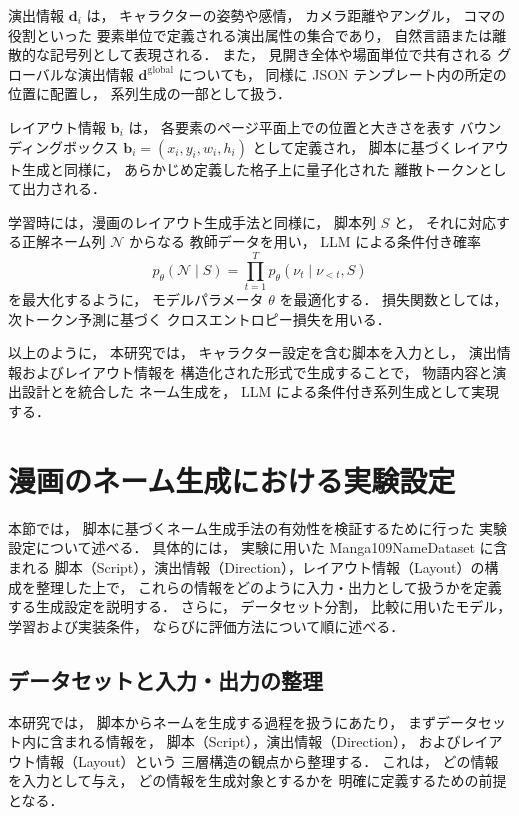 \documentclass[a4j,12pt,dvipdfmx]{jsreport}
\begin{document}
演出情報 $\mathbf{d}_i$ は，
キャラクターの姿勢や感情，
カメラ距離やアングル，
コマの役割といった
要素単位で定義される演出属性の集合であり，
自然言語または離散的な記号列として表現される．
また，
見開き全体や場面単位で共有される
グローバルな演出情報
$\mathbf{d}^{\mathrm{global}}$ についても，
同様に JSON テンプレート内の所定の位置に配置し，
系列生成の一部として扱う．

レイアウト情報 $\mathbf{b}_i$ は，
各要素のページ平面上での位置と大きさを表す
バウンディングボックス
$\mathbf{b}_i = (x_i, y_i, w_i, h_i)$ として定義され，
脚本に基づくレイアウト生成と同様に，
あらかじめ定義した格子上に量子化された
離散トークンとして出力される．

学習時には，漫画のレイアウト生成手法と同様に，
脚本列 $S$ と，
それに対応する正解ネーム列 $\mathcal{N}$ からなる
教師データを用い，
LLM による条件付き確率
\begin{equation}
   p_{\theta}(\mathcal{N} \mid S)
   =
   \prod_{t=1}^{T}
   p_{\theta}(\nu_t \mid \nu_{<t}, S)
\end{equation}
を最大化するように，
モデルパラメータ $\theta$ を最適化する．
損失関数としては，
次トークン予測に基づく
クロスエントロピー損失を用いる．

以上のように，
本研究では，
キャラクター設定を含む脚本を入力とし，
演出情報およびレイアウト情報を
構造化された形式で生成することで，
物語内容と演出設計とを統合した
ネーム生成を，
LLM による条件付き系列生成として実現する．

\section{漫画のネーム生成における実験設定}
\label{sec:script2name_experiment}
本節では，
脚本に基づくネーム生成手法の有効性を検証するために行った
実験設定について述べる．
具体的には，
実験に用いた Manga109NameDataset に含まれる
脚本（Script），演出情報（Direction），レイアウト情報（Layout）の構成を整理した上で，
これらの情報をどのように入力・出力として扱うかを定義する生成設定を説明する．
さらに，
データセット分割，
比較に用いたモデル，
学習および実装条件，
ならびに評価方法について順に述べる．

\subsection{データセットと入力・出力の整理}

本研究では，
脚本からネームを生成する過程を扱うにあたり，
まずデータセット内に含まれる情報を，
脚本（Script），演出情報（Direction），
およびレイアウト情報（Layout）という
三層構造の観点から整理する．
これは，
どの情報を入力として与え，
どの情報を生成対象とするかを
明確に定義するための前提となる．
\end{document}
